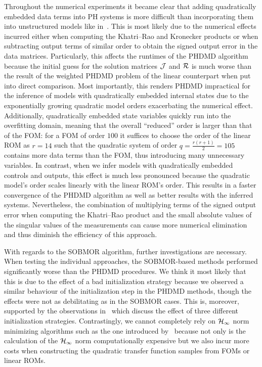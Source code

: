 Throughout the numerical experiments it became clear that adding quadratically embedded data terms into \ac{PH} systems is more difficult than incorporating them into unstructured models like in~\cite{Geelen2023}.
This is most likely due to the numerical effects incurred either when computing the Khatri--Rao and Kronecker products or when subtracting output terms of similar order to obtain the signed output error in the data matrices.
Particularly, this affects the runtimes of the \ac{PHDMD} algorithm because the initial guess for the solution matrices $\mathcal{J}$ and $\mathcal{R}$ is much worse than the result of the weighted \ac{PHDMD} problem of the linear counterpart when put into direct comparison.
Most importantly, this renders \ac{PHDMD} impractical for the inference of models with quadratically embedded internal states due to the exponentially growing quadratic model orders exacerbating the numerical effect.
Additionally, quadratically embedded state variables quickly run into the overfitting domain, meaning that the overall ``reduced'' order is larger than that of the \ac{FOM}: for a \ac{FOM} of order $100$ it suffices to choose the order of the linear \ac{ROM} as $r = 14$ such that the quadratic system of order $q = \frac{r (r + 1)}{2} = 105$ contains more data terms than the \ac{FOM}, thus introducing many unnecessary variables.
In contrast, when we infer models with quadratically embedded controls and outputs, this effect is much less pronounced because the quadratic model's order scales linearly with the linear \ac{ROM}'s order.
This results in a faster convergence of the \ac{PHDMD} algorithm as well as better results with the inferred systems.
Nevertheless, the combination of multiplying terms of the signed output error when computing the Khatri--Rao product and the small absolute values of the singular values of the measurements can cause more numerical elimination and thus diminish the efficiency of this approach.

With regards to the \ac{SOBMOR} algorithm, further investigations are necessary.
When testing the individual approaches, the \ac{SOBMOR}-based methods performed significantly worse than the \ac{PHDMD} procedures.
We think it most likely that this is due to the effect of a bad initialization strategy because we observed a similar behaviour of the initialization step in the \ac{PHDMD} methods, though the effects were not as debilitating as in the \ac{SOBMOR} cases.
This is, moreover, supported by the observations in~\cite[Section~4.1]{SV2023} which discuss the effect of three different initialization strategies.
Contrastingly, we cannot completely rely on $\mathcal{H}_\infty$ norm minimizing algorithms such as the one introduced by~\cite{Beddig2019} because not only is the calculation of the $\mathcal{H}_\infty$ norm computationally expensive but we also incur more costs when constructing the quadratic transfer function samples from \acp{FOM} or linear \acp{ROM}.

